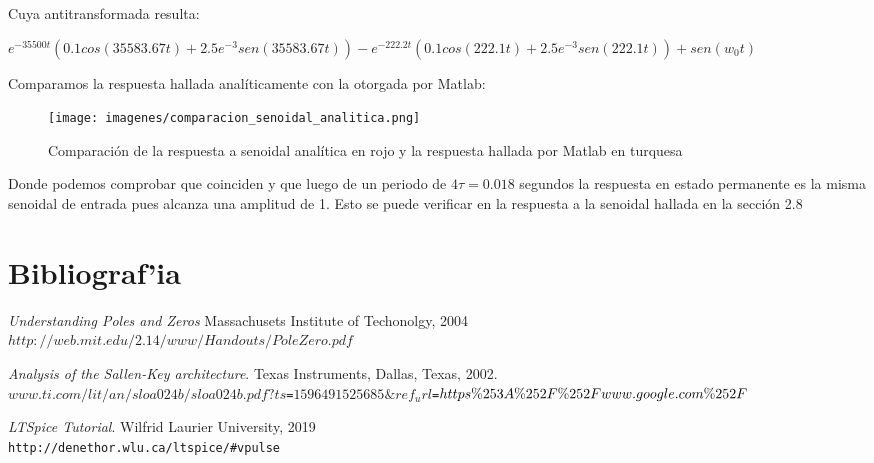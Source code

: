 \documentclass[12pt, titlepage]{article}
\begin{document}
    Cuya antitransformada resulta:
    \begin{center}
        \footnotesize $e^{-35500t}(0.1cos(35583.67t)+2.5e^{-3}sen(35583.67t))-e^{-222.2t}(0.1cos(222.1t)+2.5e^{-3}sen(222.1t))+sen(w_0t)$
    \end{center}
    
    Comparamos la respuesta hallada analíticamente con la otorgada por Matlab:
    
    \begin{figure}[!htb]
    \texttt{[image: imagenes/comparacion\_senoidal\_analitica.png]}
    \centering
    \caption{Comparación de la respuesta a senoidal analítica en rojo y la respuesta hallada por Matlab en turquesa}
    \end{figure}
    
    Donde podemos comprobar que coinciden y que luego de un periodo de $4\tau = 0.018$ segundos la respuesta en estado permanente es la misma senoidal de entrada pues alcanza una amplitud de 1. Esto se puede verificar en la respuesta a la senoidal hallada en la sección 2.8
    
    \newpage
    
    \section{Bibliograf'ia}
    
   
        \begin{thebibliography}{9}
        
        \bibitem{}
        \textit{Understanding Poles and Zeros}
        Massachusets Institute of Techonolgy, 2004
        \\\footnotesize\texttt{$http://web.mit.edu/2.14/www/Handouts/PoleZero.pdf$}
        
        \bibitem{} 
        \textit{Analysis of the Sallen-Key architecture}. 
        Texas Instruments, Dallas, Texas, 2002.
        \\\footnotesize\texttt{$www.ti.com/lit/an/sloa024b/sloa024b.pdf?ts$=$1596491525685\&ref_url$=$https\%253A\%252F\%252\\Fwww.google.com\%252F$}
        
        \bibitem{} 
        \textit{LTSpice Tutorial}. 
        Wilfrid Laurier University, 2019 
        \\\footnotesize\texttt{http://denethor.wlu.ca/ltspice/\#vpulse}
        
        \end{thebibliography}
    
    
\end{document}
